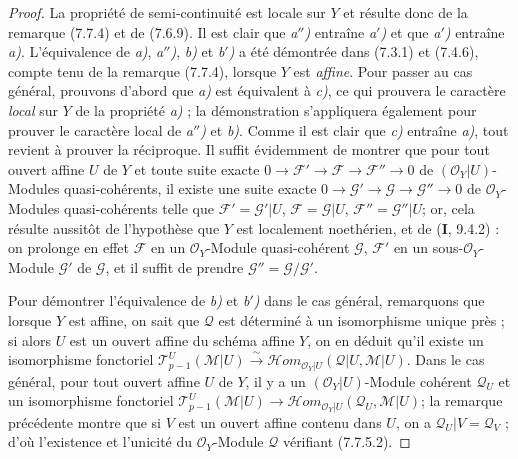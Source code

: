 \begin{proof}
La propriété de semi-continuité est locale sur $Y$ et résulte donc de la
remarque (7.7.4) et de (7.6.9). Il est clair que \emph{a$''$)} entraîne \emph{a$'$)} et que
\emph{a$'$)} entraîne \emph{a)}. L'équivalence de \emph{a)}, \emph{a$''$)}, \emph{b)} et \emph{b$'$)} a été démontrée
dans (7.3.1) et (7.4.6), compte tenu de la remarque (7.7.4), lorsque $Y$ est
\emph{affine}. Pour passer au cas général, prouvons d'abord que \emph{a)} est équivalent à \emph{c)},
ce qui prouvera le caractère \emph{local} sur $Y$ de la propriété \emph{a)} ; la démonstration
s'appliquera également pour prouver le caractère local de \emph{a$''$)} et \emph{b)}. Comme il
est clair que \emph{c)} entraîne \emph{a)}, tout revient à prouver la réciproque. Il suffit
évidemment de montrer que pour tout ouvert affine $U$ de $Y$ et toute suite
exacte
$0\longrightarrow\mathscr F'\longrightarrow\mathscr F\longrightarrow\mathscr F''\longrightarrow0$
de $(\mathscr O_Y|U)$-Modules quasi-cohérents, il existe une suite exacte
$0\longrightarrow\mathscr G'\longrightarrow\mathscr G\longrightarrow\mathscr G''\longrightarrow0$
de $\mathscr O_Y$-Modules quasi-cohérents telle que
$\mathscr F'=\mathscr G'|U$, $\mathscr F=\mathscr G|U$, $\mathscr F''=\mathscr G''|U$;
or, cela résulte aussitôt de l'hypothèse que $Y$ est localement noethérien, et
de (\textbf{I}, 9.4.2) : on prolonge en effet $\mathscr F$ en un $\mathscr O_Y$-Module
quasi-cohérent $\mathscr G$, $\mathscr F'$ en un sous-$\mathscr O_Y$-Module
$\mathscr G'$ de $\mathscr G$, et il suffit de prendre
$\mathscr G''=\mathscr G/\mathscr G'$.

Pour démontrer l'équivalence de \emph{b)} et \emph{b$'$)} dans le cas général, remarquons que
lorsque $Y$ est affine, on sait que $\mathscr Q$ est déterminé à un isomorphisme
unique près ; si alors $U$ est un ouvert affine du schéma affine $Y$, on en
déduit qu'il existe un isomorphisme fonctoriel
$\mathscr T_{p-1}^{U}(\mathscr M|U)\xrightarrow{\sim}\mathscr{H}\!om_{\mathscr O_Y|U}(\mathscr Q|U,\mathscr M|U)$.
Dans le cas général, pour tout ouvert affine $U$ de $Y$, il y a un
$(\mathscr O_Y|U)$-Module cohérent $\mathscr Q_U$ et un isomorphisme fonctoriel
$\mathscr T_{p-1}^{U}(\mathscr M|U)\to\mathscr{H}\!om_{\mathscr O_Y|U}(\mathscr Q_U,\mathscr M|U)$;
la remarque précédente montre que si $V$ est un ouvert affine contenu dans $U$,
on a $\mathscr Q_U|V=\mathscr Q_V$ ; d'où l'existence et l'unicité du
$\mathscr O_Y$-Module $\mathscr Q$ vérifiant (7.7.5.2).


\end{proof}
